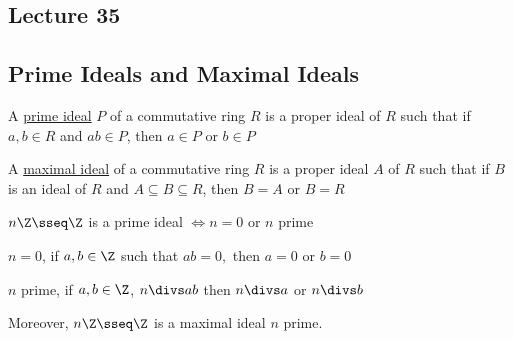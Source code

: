 \subsection*{Lecture 35} %
\subsection{Prime Ideals and Maximal Ideals}

\begin{definition}
  A \ul{prime ideal} \( P \) of a commutative ring \( R \) is a proper ideal of \( R \) such that if \( a,b\in R \) and \( ab\in P \), then \( a\in P \) or \( b\in P \)

  A \ul{maximal ideal} of a commutative ring \( R \) is a proper ideal \( A \) of \( R \) such that if \( B \) is an ideal of \( R \) and \( A\subseteq B\subseteq R \), then \( B=A \) or \( B=R \)
\end{definition}

\begin{example}
  \( n\Z \sseq \Z \) is a prime ideal \( \iff n=0 \) or \( n \) prime
  \begin{note}
    \( n = 0 \), if \( a,b\in \Z \) such that \( ab = 0, \) then \( a=0 \) or \( b=0 \) \checkmark

    \( n \) prime, if \( a,b\in\Z \), \( n\divs ab \) then \( n\divs a  \) or \( n\divs b \) \checkmark
  \end{note}
  Moreover, \( n\Z\sseq\Z \) is a maximal ideal \tiff \( n \) prime.
\end{example}

\pagebreak
